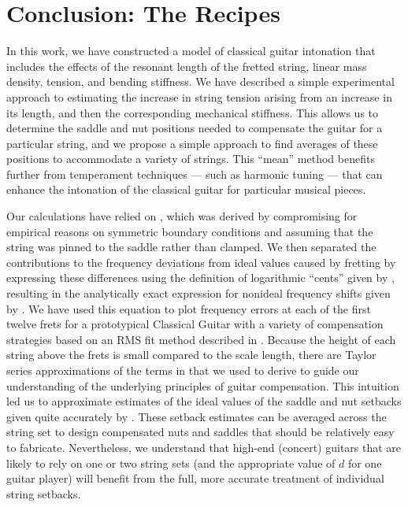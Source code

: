 %
%
%

 \section{Conclusion: The Recipes\label{sct:conc}}

 In this work, we have constructed a model of classical guitar intonation that includes the effects of the resonant length of the fretted string, linear mass density, tension, and bending stiffness. We have described a simple experimental approach to estimating the increase in string tension arising from an increase in its length, and then the corresponding mechanical stiffness. This allows us to determine the saddle and nut positions needed to compensate the guitar for a particular string, and we propose a simple approach to find averages of these positions to accommodate a variety of strings. This ``mean'' method benefits further from temperament techniques --- such as harmonic tuning --- that can enhance the intonation of the classical guitar for particular musical pieces.

Our calculations have relied on , which was derived by compromising for empirical reasons on symmetric boundary conditions and assuming that the string was pinned to the saddle rather than clamped. We then separated the contributions to the frequency deviations from ideal values caused by fretting by expressing these differences using the definition of logarithmic ``cents'' given by , resulting in the analytically exact expression for nonideal frequency shifts given by . We have used this equation to plot frequency errors at each of the first twelve frets for a prototypical Classical Guitar with a variety of compensation strategies based on an  RMS fit method described in . Because the height of each string above the frets is small compared to the scale length, there are Taylor series approximations of the terms in  that we used to derive  to guide our understanding of the underlying principles of guitar compensation. This intuition led us to approximate estimates of the ideal values of the saddle and nut setbacks given quite accurately by . These setback estimates can be averaged across the string set to design compensated nuts and saddles that should be relatively easy to fabricate. Nevertheless, we understand that high-end (concert) guitars that are likely to rely on one or two string sets (and the appropriate value of $d$ for one guitar player) will benefit from the full, more accurate treatment of individual string setbacks.

